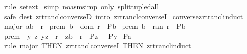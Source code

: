 \begin{isabellebody}
%
\isadelimproof
\isanewline
%
\endisadelimproof
%
\isatagproof
{}\isamarkupfalse%
\ {\isacharparenleft}rule\ set{\isacharunderscore}ext{\isacharparenright}\isanewline
{}\isamarkupfalse%
\ {\isacharparenleft}simp\ {\isacharparenleft}no{\isacharunderscore}asm{\isacharunderscore}simp{\isacharparenright}\ only{\isacharcolon}\ split{\isacharunderscore}tupled{\isacharunderscore}all{\isacharparenright}\isanewline
{}\isamarkupfalse%
\ {\isacharparenleft}safe\ dest{\isacharbang}{\isacharcolon}\ zrtrancl{\isacharunderscore}converseD\ intro{\isacharbang}{\isacharcolon}\ zrtrancl{\isacharunderscore}converseI{\isacharparenright}\isanewline
{}\isamarkupfalse%
%
\endisatagproof
{\isafoldproof}%
%
\isadelimproof
\isanewline
%
\endisadelimproof
\isanewline
{}\isamarkupfalse%
\ converse{\isacharunderscore}zrtrancl{\isacharunderscore}induct{\isacharcolon}\isanewline
{}\ major{\isacharcolon}\ {\isachardoublequoteopen}{\isacharparenleft}a{\isacharcomma}b{\isacharparenright}\ {\isacharcolon}\ r{\isacharpercent}{\isacharasterisk}{\isachardoublequoteclose}\isanewline
{}\ prem{}{\isacharcolon}\ {\isachardoublequoteopen}b\ {\isacharcolon}\ dom\ r\ {\isacharequal}{\isacharequal}{\isachargreater}\ P{\isacharparenleft}b{\isacharparenright}{\isachardoublequoteclose}\isanewline
{}\ prem{}{\isacharcolon}\ {\isachardoublequoteopen}b\ {\isacharcolon}\ ran\ r\ {\isacharequal}{\isacharequal}{\isachargreater}\ P{\isacharparenleft}b{\isacharparenright}{\isachardoublequoteclose}\isanewline
{}\ prem{}{\isacharcolon}\ {\isachardoublequoteopen}\ {\isacharbang}{\isacharbang}y\ z{\isachardot}{\isasymlbrakk}\ {\isacharparenleft}y{\isacharcomma}z{\isacharparenright}\ {\isacharcolon}\ r{\isacharsemicolon}\ \ {\isacharparenleft}z{\isacharcomma}b{\isacharparenright}\ {\isacharcolon}\ r{\isacharpercent}{\isacharasterisk}{\isacharsemicolon}\ \ P{\isacharparenleft}z{\isacharparenright}\ {\isasymrbrakk}\ {\isasymLongrightarrow}\ P{\isacharparenleft}y{\isacharparenright}{\isachardoublequoteclose}\isanewline
{}\ {\isachardoublequoteopen}P{\isacharparenleft}a{\isacharparenright}{\isachardoublequoteclose}\isanewline
%
\isadelimproof
%
\endisadelimproof
%
\isatagproof
{}\isamarkupfalse%
\ {\isacharparenleft}rule\ major\ {\isacharbrackleft}THEN\ zrtrancl{\isacharunderscore}converseI\ {\isacharbrackleft}THEN\ zrtrancl{\isacharunderscore}induct{\isacharbrackright}{\isacharbrackright}{\isacharparenright}\isanewline

\end{isabellebody}
